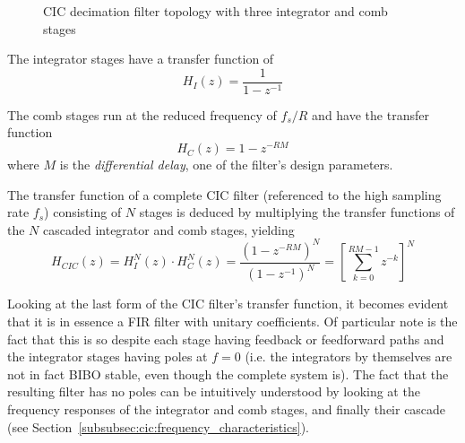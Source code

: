 \begin{figure}
    \centering
    
    \caption[CIC Filter Topology]
        {CIC decimation filter topology with three integrator and comb stages}
    \label{fig:filtertopologies:cic}
\end{figure}

The integrator stages have a transfer function of
\begin{equation}
    \label{eq:cic:integrator_stage}
    H_I(z) = \frac{1}{1-z^{-1}}
\end{equation}

The comb stages run at the reduced frequency of $f_s/R$ and have the transfer
function
\begin{equation}
    \label{eq:cic:comb_stage}
    H_C(z) = 1 - z^{-RM}
\end{equation}
where  $M$  is the  \emph{differential  delay},  one  of the  filter's  design
parameters.

The  transfer function  of  a  complete CIC  filter  (referenced  to the  high
sampling rate  $f_s$) consisting of $N$  stages is deduced by  multiplying the
transfer functions of the $N$ cascaded integrator and comb stages, yielding
\begin{equation}
    \label{eq:cic:complete}
    H_{CIC}(z) = H_I^N(z) \cdot H_C^N(z) =
    \frac{\left(1 - z^{-RM}\right)^N}{\left( 1 - z^{-1} \right)^N} =
    \left[\sum_{k = 0}^{RM-1} z^{-k}\right]^N
\end{equation}

Looking at  the last form  of the CIC  filter's transfer function,  it becomes
evident  that it  is in  essence a  FIR filter  with unitary  coefficients. Of
particular note is the fact that this is so despite each stage having feedback
or feedforward paths and  the integrator stages having poles at  $f = 0$ (i.e.
the integrators  by themselves are  not in fact  BIBO stable, even  though the
complete  system  is). The  fact  that  the  resulting  filter  has  no  poles
can  be  intuitively   understood  by  looking  at   the  frequency  responses
of  the   integrator  and  comb   stages,  and  finally  their   cascade  (see
Section~\ref{subsubsec:cic:frequency_characteristics}).


